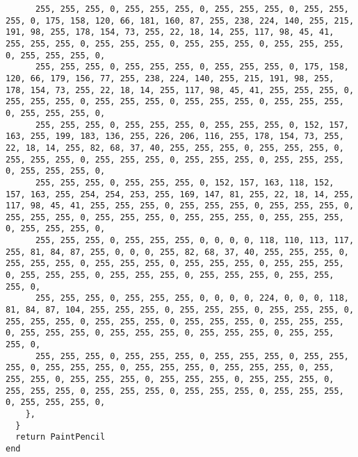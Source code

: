 \documentclass{ctexart}
\begin{document}
\begin{lstlisting}
      255, 255, 255, 0, 255, 255, 255, 0, 255, 255, 255, 0, 255, 255, 255, 0, 175, 158, 120, 66, 181, 160, 87, 255, 238, 224, 140, 255, 215, 191, 98, 255, 178, 154, 73, 255, 22, 18, 14, 255, 117, 98, 45, 41, 255, 255, 255, 0, 255, 255, 255, 0, 255, 255, 255, 0, 255, 255, 255, 0, 255, 255, 255, 0, 
      255, 255, 255, 0, 255, 255, 255, 0, 255, 255, 255, 0, 175, 158, 120, 66, 179, 156, 77, 255, 238, 224, 140, 255, 215, 191, 98, 255, 178, 154, 73, 255, 22, 18, 14, 255, 117, 98, 45, 41, 255, 255, 255, 0, 255, 255, 255, 0, 255, 255, 255, 0, 255, 255, 255, 0, 255, 255, 255, 0, 255, 255, 255, 0, 
      255, 255, 255, 0, 255, 255, 255, 0, 255, 255, 255, 0, 152, 157, 163, 255, 199, 183, 136, 255, 226, 206, 116, 255, 178, 154, 73, 255, 22, 18, 14, 255, 82, 68, 37, 40, 255, 255, 255, 0, 255, 255, 255, 0, 255, 255, 255, 0, 255, 255, 255, 0, 255, 255, 255, 0, 255, 255, 255, 0, 255, 255, 255, 0, 
      255, 255, 255, 0, 255, 255, 255, 0, 152, 157, 163, 118, 152, 157, 163, 255, 254, 254, 253, 255, 169, 147, 81, 255, 22, 18, 14, 255, 117, 98, 45, 41, 255, 255, 255, 0, 255, 255, 255, 0, 255, 255, 255, 0, 255, 255, 255, 0, 255, 255, 255, 0, 255, 255, 255, 0, 255, 255, 255, 0, 255, 255, 255, 0, 
      255, 255, 255, 0, 255, 255, 255, 0, 0, 0, 0, 118, 110, 113, 117, 255, 81, 84, 87, 255, 0, 0, 0, 255, 82, 68, 37, 40, 255, 255, 255, 0, 255, 255, 255, 0, 255, 255, 255, 0, 255, 255, 255, 0, 255, 255, 255, 0, 255, 255, 255, 0, 255, 255, 255, 0, 255, 255, 255, 0, 255, 255, 255, 0, 
      255, 255, 255, 0, 255, 255, 255, 0, 0, 0, 0, 224, 0, 0, 0, 118, 81, 84, 87, 104, 255, 255, 255, 0, 255, 255, 255, 0, 255, 255, 255, 0, 255, 255, 255, 0, 255, 255, 255, 0, 255, 255, 255, 0, 255, 255, 255, 0, 255, 255, 255, 0, 255, 255, 255, 0, 255, 255, 255, 0, 255, 255, 255, 0, 
      255, 255, 255, 0, 255, 255, 255, 0, 255, 255, 255, 0, 255, 255, 255, 0, 255, 255, 255, 0, 255, 255, 255, 0, 255, 255, 255, 0, 255, 255, 255, 0, 255, 255, 255, 0, 255, 255, 255, 0, 255, 255, 255, 0, 255, 255, 255, 0, 255, 255, 255, 0, 255, 255, 255, 0, 255, 255, 255, 0, 255, 255, 255, 0, 
    },
  }
  return PaintPencil
end


\end{lstlisting}
\end{document}
